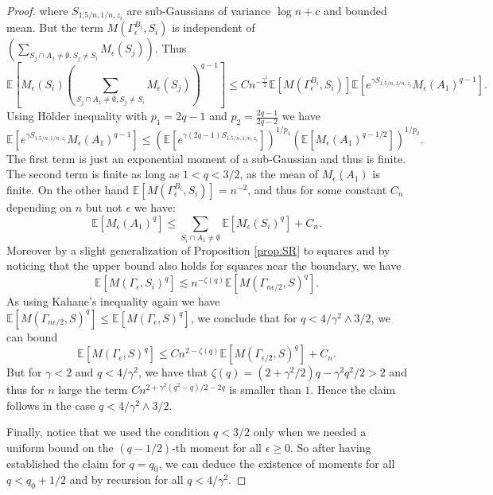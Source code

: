 \documentclass[11pt]{amsart}
\newcommand{\E}{\mathbb E}
\renewcommand{\1}{\mathbf 1}
\newcommand{\eps}{\epsilon}
\begin{document}
\begin{proof}
   where $S_{1.5/n,1/n,z_i}$ are sub-Gaussians of variance $\log n + c$ and bounded mean.
   But the term $M(\Gamma_\eps^{B_i},S_i)$ is independent of $\left(\sum_{S_j \cap A_1 \neq \emptyset, S_j \neq S_i} M_\eps (S_j)\right)$. Thus
   $$\E \left[M_\eps (S_i) \left(\sum_{S_j \cap A_1 \neq \emptyset, S_j \neq S_i} M_\eps (S_j)\right)^{q-1}\right]\leq Cn^{-\frac{\gamma^2}{2}}\E\left[M(\Gamma_\eps^{B_i},S_i)\right]\E\left[e^{\gamma S_{1.5/n, 1/n, z_i}}M_\eps(A_1)^{q-1}\right].$$
 Using H\"older inequality with $p_1 = 2q-1$ and $p_2 = \frac{2q-1}{2q-2}$ we have
   $$\E\left[e^{\gamma S_{1.5/n, 1/n, z_i}}M_\eps(A_1)^{q-1}\right] \leq \left(\E\left[e^{\gamma(2q-1) S_{1.5/n, 1/n, z_i}}\right]\right)^{1/p_1} \left(\E\left[M_\eps(A_1)^{q-1/2}\right]\right)^{1/p_2}.$$ 
   The first term is just an exponential moment of a sub-Gaussian and thus is finite. The second term is finite as long as $1 < q < 3/2$, as the mean of $M_\eps(A_1)$ is finite. On the other hand $\E\left[M(\Gamma_\eps^{B_i},S_i)\right] = n^{-2}$, and thus for some constant $C_n$ depending on $n$ but not $\eps$ we have:
\[ \E \left[M_\eps(A_1)^{q}\right] \leq \sum_{S_i \cap A_1 \neq
   \emptyset} \E \left[M_\eps (S_i)^{q}\right] + C_n.\]
Moreover by a slight generalization of Proposition \ref{prop:SR} to squares and by noticing that the upper bound also holds for squares near the boundary, we have
\[ \E \left[M(\Gamma_\eps, S_i)^q\right] \lesssim n^{-\zeta(q)} \E \left[M(\Gamma_{n\eps/2},S)^q\right]. \]
As using Kahane's inequality again we have $\E \left[M(\Gamma_{n\eps/2},S)^q\right] \leq \E \left[M(\Gamma_{\eps},S)^q\right]$, we conclude that 
for $q < 4/\gamma^2 \wedge 3/2$, we can bound 
\[ \E \left[M(\Gamma_\eps, S)^q\right] \leq Cn^{2-\zeta(q)} \E \left[M(\Gamma_{\eps/2},S)^q\right] + C_n.\]
But for $\gamma < 2$ and $q < 4/\gamma^2$, we have that $\zeta(q) = (2 + \gamma^2 /
2)q - \gamma^2 q^2 / 2 > 2$ and thus for $n$ large the term $Cn^{2+\gamma^2 (q^2-q) / 2
-2q}$ is smaller than $1$. Hence the claim follows in the case $q < 4/\gamma^2 \wedge 3/2$. 

Finally, notice that we used the condition $q < 3/2$ only when we needed a uniform bound on the $(q-1/2)$-th moment for all $\eps \geq 0$. So after having established the claim for $q =q_0$, we can deduce the existence of moments for all $q < q_0 + 1/2$ and by recursion for all $q <  4/\gamma^2 $.
\end{proof}
\end{document}
